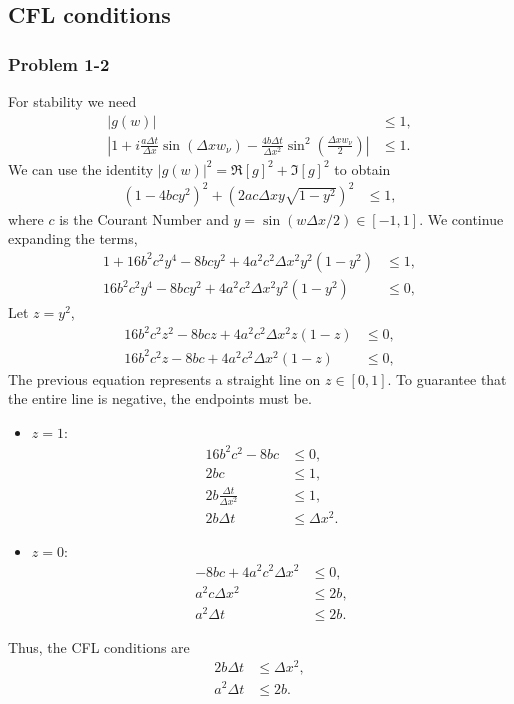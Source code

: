 \subsection*{CFL conditions}
\subsubsection*{Problem 1-2}
For stability we need 
\begin{align*}
|g(w)|&\leq 1,\\
\left|1+i\frac{a\Delta t}{ \Delta x}\sin\left(\Delta xw_{\nu}\right)-\frac{4b\Delta t}{\Delta x^2}\sin^2\left(\frac{\Delta xw_{\nu}}{2}\right)\right| &\leq 1.
\end{align*}
We can use the identity $|g(w)|^2 = \Re\left[g\right]^2+\Im\left[g\right]^2$ to obtain
\begin{align*}
\left(1-4bcy^2\right)^2+\left(2ac\Delta xy\sqrt{1-y^2}\right)^2 &\leq 1,
\end{align*}
where $c$ is the Courant Number and $y = \sin\left(w\Delta x/2\right)\in[-1,1]$. We continue expanding the terms,
\begin{align*}
1+16b^2c^2y^4-8bcy^2+4a^2c^2\Delta x^2y^2(1-y^2) &\leq 1,\\
16b^2c^2y^4-8bcy^2+4a^2c^2\Delta x^2y^2(1-y^2) &\leq 0,
\end{align*}
Let $z = y^2$,
\begin{align*}
16b^2c^2z^2-8bcz+4a^2c^2\Delta x^2z(1-z) &\leq 0,\\
16b^2c^2z-8bc+4a^2c^2\Delta x^2(1-z) &\leq 0,
\end{align*}
The previous equation represents a straight line on $z\in[0,1]$. To guarantee that the entire line is negative, the endpoints must be.
\begin{itemize}
\item $z=1$:
\begin{align*}
16b^2c^2-8bc &\leq 0,\\
2bc &\leq 1,\\
2b\frac{\Delta t}{\Delta x^2} &\leq 1,\\
2b\Delta t &\leq \Delta x^2.
\end{align*}
\item $z=0$:
\begin{align*}
-8bc+4a^2c^2\Delta x^2&\leq 0,\\
a^2c\Delta x^2&\leq 2b,\\
a^2\Delta t&\leq 2b.
\end{align*}
\end{itemize}
Thus, the CFL conditions are
\begin{align}
2b\Delta t &\leq \Delta x^2,\label{eq:CFL_1}\\
a^2\Delta t&\leq 2b.\label{eq:CFL_2}
\end{align}
